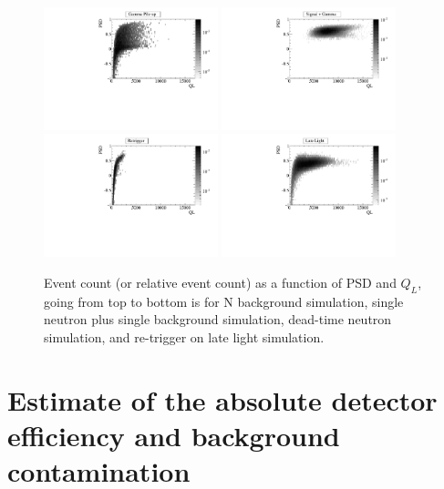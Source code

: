 \documentclass[letter,twocolumn,preprint,3p]{elsarticle}
\begin{document}
\begin{figure}[!htpb]
\centering
\includegraphics[width=0.45\textwidth]{figures/hbgpile_psdql.pdf}
\includegraphics[width=0.45\textwidth]{figures/hsigbg_psdql.pdf}
\includegraphics[width=0.45\textwidth]{figures/hretrig_psdql.pdf}
\includegraphics[width=0.45\textwidth]{figures/hlate_psdql.pdf}
\caption{ Event count (or relative event count) as a function of PSD
  and $Q_L$, going from top to bottom is for N background simulation,
  single neutron plus single background simulation, dead-time neutron
  simulation, and re-trigger on late light simulation.}
\label{fig:eventSpectra2}
\end{figure}


\section{Estimate of the absolute detector efficiency and background contamination}\label{sec:eff}
\end{document}
